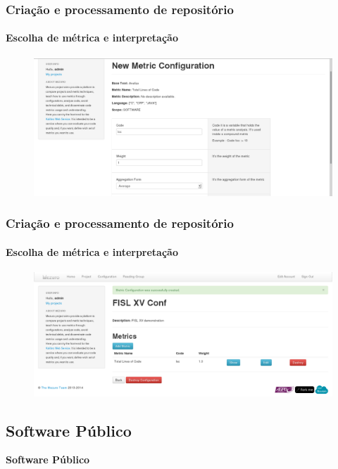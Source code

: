 \documentclass{beamer}
\begin{document}
  \begin{frame}
    \frametitle{Criação e processamento de repositório}
    \framesubtitle{Escolha de métrica e interpretação}

    \begin{figure}[htb]
      \begin{center}
        \includegraphics[scale=0.24]{images/08-new-metric-form.png}
      \end{center}
    \end{figure}
  \end{frame}

  \begin{frame}
    \frametitle{Criação e processamento de repositório}
    \framesubtitle{Escolha de métrica e interpretação}

    \begin{figure}[htb]
      \begin{center}
        \includegraphics[scale=0.24]{images/09-new-metric-created.png}
      \end{center}
    \end{figure}
  \end{frame}

  \subsection{Software Público}
  \begin{frame}
    \LARGE{\textbf{Software Público}}
  \end{frame}
\end{document}
